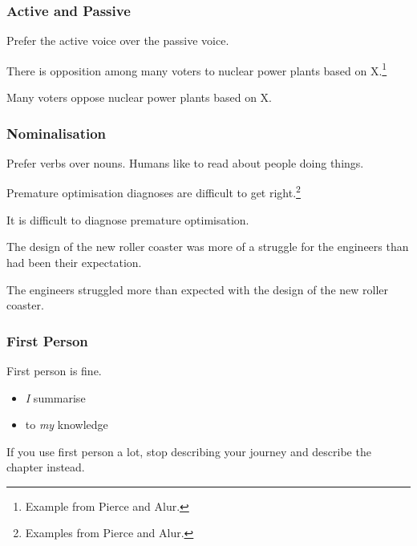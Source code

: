 \begin{frame}
  \frametitle{Active and Passive}

  Prefer the active voice over the passive voice.

  \medskip
  \pause


  There is opposition among many voters to nuclear power plants based on X.\footnote{Example from Pierce and Alur.}

  \medskip
  \pause


  Many voters oppose nuclear power plants based on X.
\end{frame}

\begin{frame}
  \frametitle{Nominalisation}

  Prefer verbs over nouns.
  Humans like to read about people doing things.

  \pause
  \medskip


  Premature optimisation diagnoses are difficult to get right.\footnote{Examples from Pierce and Alur.}

  \medskip
  \pause


  It is difficult to diagnose premature optimisation.

  \pause
  \medskip


  The design of the new roller coaster was more of a struggle for the engineers than had been their expectation.

  \medskip
  \pause


  The engineers struggled more than expected with the design of the new roller coaster.
\end{frame}

\begin{frame}
  \frametitle{First Person}

  First person is fine.
  \begin{itemize}
    \item \emph{I} summarise
    \item to \emph{my} knowledge
  \end{itemize}

  \medskip
  \pause

  If you use first person a lot, stop describing your journey and describe the chapter instead.
\end{frame}

